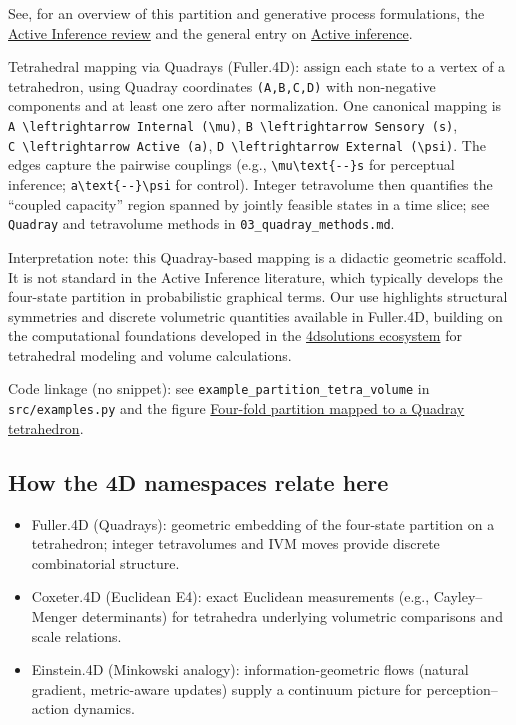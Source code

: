\documentclass[
]{article}
\providecommand{\tightlist}{%
  \setlength{\itemsep}{0pt}\setlength{\parskip}{0pt}}
\begin{document}
See, for an overview of this partition and generative process
formulations, the
\href{https://discovery.ucl.ac.uk/id/eprint/10176959/1/1-s2.0-S1571064523001094-main.pdf}{Active
Inference review} and the general entry on
\href{https://en.wikipedia.org/wiki/Active_inference}{Active inference}.

Tetrahedral mapping via Quadrays (Fuller.4D): assign each state to a
vertex of a tetrahedron, using Quadray coordinates \texttt{(A,B,C,D)}
with non-negative components and at least one zero after normalization.
One canonical mapping is
\texttt{A\ \textbackslash{}leftrightarrow\ Internal\ (\textbackslash{}mu)},
\texttt{B\ \textbackslash{}leftrightarrow\ Sensory\ (s)},
\texttt{C\ \textbackslash{}leftrightarrow\ Active\ (a)},
\texttt{D\ \textbackslash{}leftrightarrow\ External\ (\textbackslash{}psi)}.
The edges capture the pairwise couplings (e.g.,
\texttt{\textbackslash{}mu\textbackslash{}text\{-\/-\}s} for perceptual
inference; \texttt{a\textbackslash{}text\{-\/-\}\textbackslash{}psi} for
control). Integer tetravolume then quantifies the ``coupled capacity''
region spanned by jointly feasible states in a time slice; see
\texttt{Quadray} and tetravolume methods in
\texttt{03\_quadray\_methods.md}.

Interpretation note: this Quadray-based mapping is a didactic geometric
scaffold. It is not standard in the Active Inference literature, which
typically develops the four-state partition in probabilistic graphical
terms. Our use highlights structural symmetries and discrete volumetric
quantities available in Fuller.4D, building on the computational
foundations developed in the
\href{https://github.com/4dsolutions}{4dsolutions ecosystem} for
tetrahedral modeling and volume calculations.

Code linkage (no snippet): see
\texttt{example\_partition\_tetra\_volume} in \texttt{src/examples.py}
and the figure \href{../output/partition_tetrahedron.png}{Four-fold
partition mapped to a Quadray tetrahedron}.

\hypertarget{how-the-4d-namespaces-relate-here}{%
\subsection{How the 4D namespaces relate
here}\label{how-the-4d-namespaces-relate-here}}

\begin{itemize}
\tightlist
\item
  Fuller.4D (Quadrays): geometric embedding of the four-state partition
  on a tetrahedron; integer tetravolumes and IVM moves provide discrete
  combinatorial structure.
\item
  Coxeter.4D (Euclidean E4): exact Euclidean measurements (e.g.,
  Cayley--Menger determinants) for tetrahedra underlying volumetric
  comparisons and scale relations.
\item
  Einstein.4D (Minkowski analogy): information-geometric flows (natural
  gradient, metric-aware updates) supply a continuum picture for
  perception--action dynamics.
\end{itemize}
\end{document}
